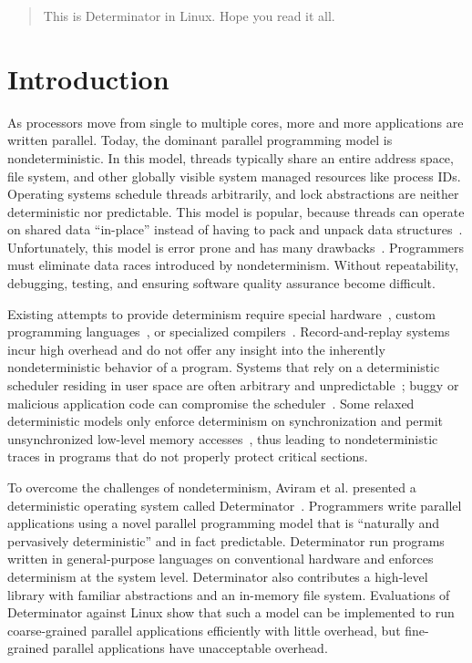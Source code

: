 
\begin{abstract}
This is Determinator in Linux. Hope you read it all.
\end{abstract}

\section{Introduction}
As processors move from single to multiple cores, more and more applications are
written parallel. Today, the dominant parallel programming model is
nondeterministic. In this model, threads typically share an entire address
space, file system, and other globally visible system managed resources like
process IDs. Operating systems schedule threads arbitrarily, and
lock abstractions are neither deterministic nor predictable. This model is
popular, because threads can operate on shared data ``in-place'' instead of
having to pack and unpack data structures~\cite{Aviram10}. Unfortunately, this
model is error prone and has many drawbacks~\cite{artho2003high,lee2006problem,
lu2008learning}. Programmers must eliminate data races introduced by
nondeterminism. Without repeatability, debugging, testing, and ensuring
software quality assurance become difficult.

Existing attempts to provide determinism require
special hardware~\cite{Devietti09,devietti2011rcdc}, custom programming
languages~\cite{bocchino2009type}, or specialized
compilers~\cite{bergan2010coredet}. Record-and-replay
systems~\cite{leblanc1987debugging,montesinos2008delorean} incur high
overhead and do not offer any insight into the inherently nondeterministic
behavior of a program. Systems that rely on a deterministic
scheduler residing in user space are often arbitrary and
unpredictable~\cite{olszewski2009kendo}; buggy or malicious application code
can compromise the scheduler~\cite{Aviram10,cui2010stable}.  Some relaxed
deterministic models only enforce determinism on synchronization and permit
unsynchronized low-level memory accesses~\cite{olszewski2009kendo}, thus leading
to nondeterministic traces in programs that do not properly protect critical
sections.

To overcome the challenges of nondeterminism, Aviram et al. presented a
deterministic operating system called Determinator~\cite{Aviram10}.
Programmers write parallel applications using a novel parallel programming model
that is ``naturally and pervasively deterministic'' and in fact predictable.
Determinator run programs written in general-purpose languages on
conventional hardware and enforces determinism at the system level.
Determinator also contributes a high-level library with familiar abstractions
and an in-memory file system.
Evaluations of Determinator against Linux show that such a model can be
implemented to run coarse-grained parallel applications efficiently with little
overhead, but fine-grained parallel applications have unacceptable overhead.

